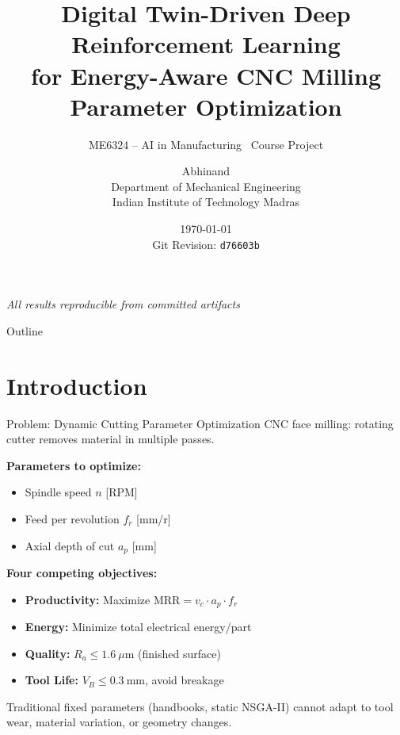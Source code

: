 ﻿\documentclass[11pt,aspectratio=169]{beamer}
\title[Digital Twin DRL for CNC Milling]{Digital Twin-Driven Deep Reinforcement Learning\\for Energy-Aware CNC Milling Parameter Optimization}
\subtitle{ME6324 -- AI in Manufacturing \textbar\ Course Project}
\author{Abhinand \\ Department of Mechanical Engineering \\ Indian Institute of Technology Madras}
\institute{IIT Madras}
\date{\today \\ Git Revision: \texttt{d76603b}}
\newcommand{\MRR}{\mathrm{MRR}}
\newcommand{\Ra}{R_a}
\newcommand{\VB}{V_B}
\begin{document}
\begin{frame}
    \titlepage
    \vfill
    \centering
    \small \textit{All results reproducible from committed artifacts}
\end{frame}

\begin{frame}{Outline}
    \tableofcontents
\end{frame}

\section{Introduction}

\begin{frame}{Problem: Dynamic Cutting Parameter Optimization}
    CNC face milling: rotating cutter removes material in multiple passes.
    \vspace{0.5em}

    \textbf{Parameters to optimize:}
    \begin{itemize}
        \item Spindle speed $n$ [RPM]
        \item Feed per revolution $f_r$ [mm/r]
        \item Axial depth of cut $a_p$ [mm]
    \end{itemize}

    \vspace{0.5em}
    \textbf{Four competing objectives:}
    \begin{itemize}
        \item \textbf{Productivity:} Maximize $\MRR = v_c \cdot a_p \cdot f_r$
        \item \textbf{Energy:} Minimize total electrical energy/part
        \item \textbf{Quality:} $\Ra \le 1.6\ \mu\text{m}$ (finished surface)
        \item \textbf{Tool Life:} $\VB \le 0.3\ \text{mm}$, avoid breakage
    \end{itemize}

    \vspace{0.5em}
    \alert{Traditional fixed parameters (handbooks, static NSGA-II) cannot adapt to tool wear, material variation, or geometry changes.}
\end{frame}
\end{document}
